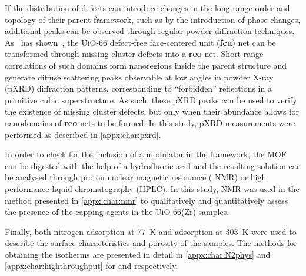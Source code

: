 
If the distribution of defects can introduce changes in the
long-range order and topology of their parent framework,
such as by the introduction of phase changes,
additional peaks can be observed through regular
powder diffraction techniques.
As~\citeauthor{cliffeCorrelatedDefectNanoregions2014} has
shown~\cite{cliffeCorrelatedDefectNanoregions2014},
the UiO-66 defect-free face-centered unit (\textbf{fcu})
net can be transformed through missing cluster defects into
a \textbf{reo} net. Short-range correlations of such domains
form nanoregions inside the parent structure and generate
diffuse scattering peaks observable at low angles in
powder X-ray (pXRD) diffraction patterns, corresponding to ``forbidden''
reflections in a primitive cubic superstructure.
As such, these pXRD peaks can be used to verify the existence of
missing cluster defects, but only when their abundance allows for
nanodomains of \textbf{reo} nets to be formed. In this study,
pXRD measurements were performed as described in \autoref{appx:char:pxrd}.

In order to check for the inclusion of a modulator in the framework,
the MOF can be digested with the help of a hydrofluoric acid and the
resulting solution can be analysed through proton nuclear magnetic 
resonance ( NMR) or high performance liquid chromatography
(HPLC). In this study,  NMR was used in the method presented
in \autoref{appx:char:nmr} to qualitatively and quantitatively assess
the presence of the capping agents in the UiO-66(Zr) samples. 

Finally, both nitrogen adsorption at \SI{77}{\kelvin} and  
adsorption at \SI{303}{\kelvin} were used to describe the surface 
characteristics and porosity of the samples. The methods for obtaining
the isotherms are presented in detail in \autoref{appx:char:N2phys}
and \autoref{appx:char:highthroughput} for  and 
respectively.
